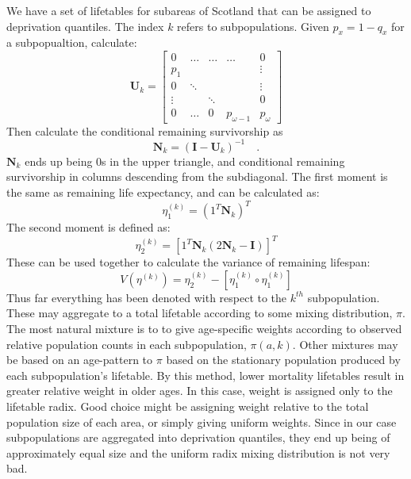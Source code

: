 \documentclass[12pt,oneside,a4paper]{article} %
\theoremstyle{definition}
\begin{document}
We have a set of lifetables for subareas of Scotland
that can be assigned to deprivation quantiles. The index $k$ refers to
subpopulations. Given $p_x = 1- q_x$ for a subpopualtion, calculate:
\begin{equation}
\mathbf{U}_k = 
\begin{bmatrix}
    0     & \hdots  & \hdots &  \hdots  & 0 \\
    p_{1} &   &    &    &  \vdots \\
    0 & \ddots &   &   & \vdots \\
    \vdots & & \ddots & & 0\\
   0 &  \hdots & 0 & p_{\omega-1}  & p_{\omega}
\end{bmatrix}
\end{equation}
Then calculate the conditional remaining survivorship as
\begin{equation}
\mathbf{N}_k = (\mathbf{I} - \mathbf{U}_k )^{-1} \quad .
\end{equation}
$\mathbf{N}_k$ ends up being 0s in the upper triangle, and conditional remaining
survivorship in columns descending from the subdiagonal. The first moment is the
same as remaining life expectancy, and can be calculated as:
\begin{equation}
\eta^{(k)}_1 = (1^T \mathbf{N}_k)^T
\end{equation}
The second moment is defined as:
\begin{equation}
\eta^{(k)}_2 = \left[ 1^T \mathbf{N}_k (2\mathbf{N}_k - \mathbf{I})\right]^T
\end{equation}
These can be used together to calculate the variance of remaining lifespan:
\begin{equation}
\label{eq:var}
V(\eta^{(k)}) = \eta^{(k)}_2 - \left[\eta^{(k)}_1 \circ \eta^{(k)}_1 \right]
\end{equation}
Thus far everything has been denoted with respect to the $k^{th}$ subpopulation.
These may aggregate to a total lifetable according to some mixing distribution,
$\pi$.
The most natural mixture is to to give age-specific weights according to
observed relative population counts in each subpopulation, $\pi(a,k)$. Other
mixtures may be based on an age-pattern to $\pi$ based on the stationary
population produced by each subpopulation's lifetable. By this method, lower
mortality lifetables result in greater relative weight in older ages. In this
case, weight is assigned only to the lifetable radix. Good choice might be
assigning weight relative to the total population size of each area, or simply
giving uniform weights. Since in our case subpopulations are aggregated into
deprivation quantiles, they end up being of approximately equal size and the
uniform radix mixing distribution is not very bad. 
\end{document}
